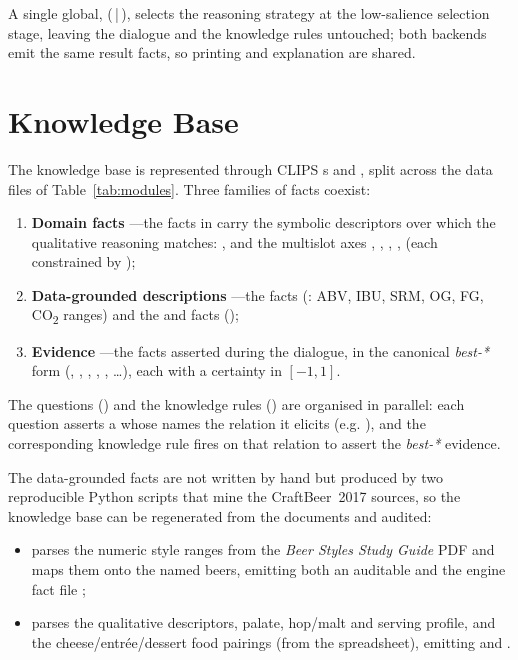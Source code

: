 A single global,  (\,|\,), selects the
reasoning strategy at the low-salience selection stage, leaving the dialogue and
the knowledge rules untouched; both backends emit the same
 result facts, so printing and explanation
are shared.

\section{Knowledge Base}

The knowledge base is represented through CLIPS s and
, split across the data files of Table~\ref{tab:modules}. Three
families of facts coexist:

\begin{enumerate}[label=(\Roman*)]
  \item \textbf{Domain facts} ---the  facts in
   carry the symbolic descriptors over which the
  qualitative reasoning matches: ,  and the multislot
  axes , , , ,
   (each constrained by );
  \item \textbf{Data-grounded descriptions} ---the  facts
  (: ABV, IBU, SRM, OG, FG, CO\textsubscript{2} ranges)
  and the  and  facts ();
  \item \textbf{Evidence} ---the  facts asserted during the
  dialogue, in the canonical \emph{best-*} form (,
  , , , ,
  \dots), each with a certainty in \([-1,1]\).
\end{enumerate}

The questions () and the knowledge rules
() are organised in parallel: each question asserts a
 whose  names the relation it elicits
(e.g. ), and the corresponding knowledge rule fires on that
relation to assert the \emph{best-*} evidence.

The data-grounded facts are not written by hand but produced by two reproducible
Python scripts that mine the CraftBeer~2017 sources, so the knowledge base can
be regenerated from the documents and audited:

\begin{itemize}[nosep]
  \item {} parses the numeric style ranges from
  the \emph{Beer Styles Study Guide} PDF and maps them onto the named beers,
  emitting both an auditable  and the engine
  fact file ;
  \item {} parses the qualitative descriptors,
  palate, hop/malt and serving profile, and the cheese/entr\'ee/dessert food
  pairings (from the spreadsheet), emitting  and
  .
\end{itemize}

